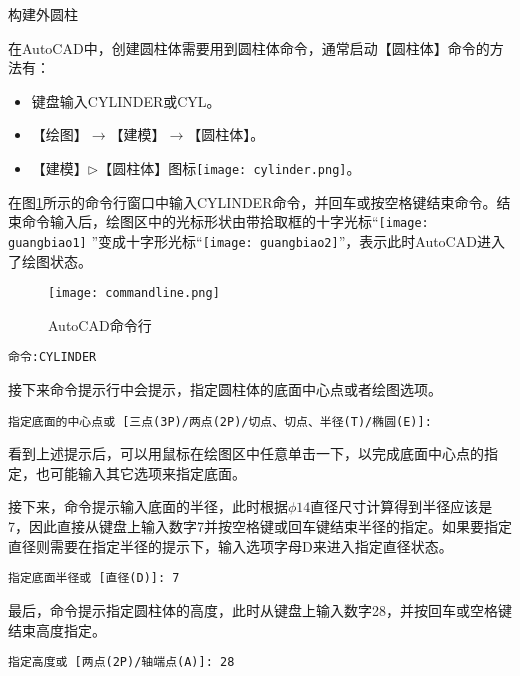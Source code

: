 \begin{procedure}

\item 构建外圆柱

在AutoCAD中，创建圆柱体需要用到圆柱体命令，通常启动【圆柱体】命令的方法有：
\begin{itemize}
\item 键盘输入CYLINDER或CYL。
\item 【绘图】$\rightarrow$【建模】$\rightarrow$【圆柱体】。
\item 【建模】$\triangleright$【圆柱体】图标\texttt{[image: cylinder.png]}。
\end{itemize}

在图\ref{fig:commandline}所示的命令行窗口中输入CYLINDER命令，并回车或按空格键结束命令。结束命令输入后，绘图区中的光标形状由带拾取框的十字光标“\texttt{[image: guangbiao1]} ”变成十字形光标“\texttt{[image: guangbiao2]}”，表示此时AutoCAD进入了绘图状态。
\begin{figure}[htbp]
\centering
\texttt{[image: commandline.png]}
\caption{AutoCAD命令行}\label{fig:commandline}
\end{figure}

\begin{lstlisting}
命令:CYLINDER
\end{lstlisting}

接下来命令提示行中会提示，指定圆柱体的底面中心点或者绘图选项。
\begin{lstlisting}
指定底面的中心点或 [三点(3P)/两点(2P)/切点、切点、半径(T)/椭圆(E)]:
\end{lstlisting}

看到上述提示后，可以用鼠标在绘图区中任意单击一下，以完成底面中心点的指定，也可能输入其它选项来指定底面。

接下来，命令提示输入底面的半径，此时根据$\phi 14$直径尺寸计算得到半径应该是7，因此直接从键盘上输入数字7并按空格键或回车键结束半径的指定。如果要指定直径则需要在指定半径的提示下，输入选项字母D来进入指定直径状态。
\begin{lstlisting}
指定底面半径或 [直径(D)]: 7
\end{lstlisting}

最后，命令提示指定圆柱体的高度，此时从键盘上输入数字28，并按回车或空格键结束高度指定。
\begin{lstlisting}
指定高度或 [两点(2P)/轴端点(A)]: 28
\end{lstlisting}


\end{procedure}
